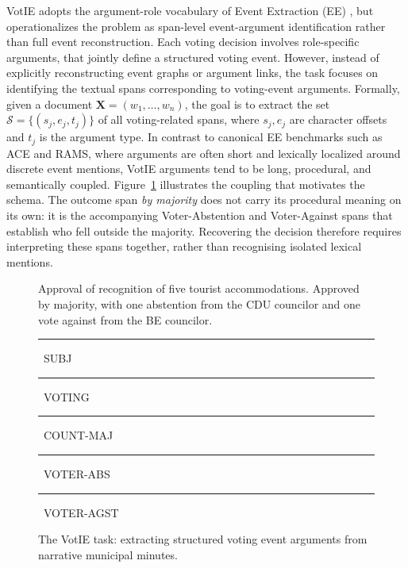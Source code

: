 \documentclass[11pt]{article}
\begin{document}
VotIE adopts the argument-role vocabulary of Event Extraction (EE) \cite{doddington-etal-2004-automatic,ebner-etal-2020-multi,wang-etal-2024-maven}, but operationalizes the problem as span-level event-argument identification rather than full event reconstruction. Each voting decision involves role-specific arguments, that jointly define a structured voting event. However, instead of explicitly reconstructing event graphs or argument links, the task focuses on identifying the textual spans corresponding to voting-event arguments. Formally, given a document $\mathbf{X} = (w_1, \dots, w_n)$, the goal is to extract the set $\mathcal{S} = \{(s_j, e_j, t_j)\}$ of all voting-related spans, where $s_j, e_j$ are character offsets and $t_j$ is the argument type. In contrast to canonical EE benchmarks such as ACE and RAMS, where arguments are often short and lexically localized around discrete event mentions, VotIE arguments tend to be long, procedural, and semantically coupled. Figure~\ref{fig:votie_task} illustrates the coupling that motivates the schema.  The outcome span \textit{by majority} does not carry its procedural meaning on its own: it is the accompanying Voter-Abstention and Voter-Against spans that establish who fell outside the majority. Recovering the decision therefore requires interpreting these spans together, rather than recognising isolated lexical mentions.

\begin{figure}[ht!] 
\small
\fboxsep=2pt

\noindent
\colorbox{blue!15}{Approval of recognition of five tourist accommodations}.
\colorbox{green!15}{Approved} \colorbox{cyan!15}{by majority}, with one 
abstention from the \colorbox{orange!15}{CDU councilor} and one vote against 
from the \colorbox{purple!15}{BE councilor}.

\medskip

{\scriptsize\centering\noindent
\colorbox{blue!15}{\rule{0pt}{1ex}\rule{1ex}{0pt}}~SUBJ\hspace{2pt}
\colorbox{green!15}{\rule{0pt}{1ex}\rule{1ex}{0pt}}~VOTING\hspace{2pt}
\colorbox{cyan!15}{\rule{0pt}{1ex}\rule{1ex}{0pt}}~COUNT-MAJ\hspace{2pt}
\colorbox{orange!15}{\rule{0pt}{1ex}\rule{1ex}{0pt}}~VOTER-ABS\hspace{2pt}
\colorbox{purple!15}{\rule{0pt}{1ex}\rule{1ex}{0pt}}~VOTER-AGST
}
\caption{The VotIE task: extracting structured voting event arguments from narrative municipal minutes.}
\label{fig:votie_task}
\end{figure}
\end{document}
